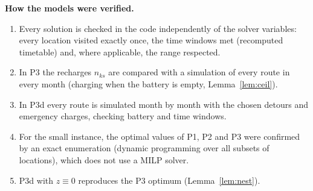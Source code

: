 \documentclass[11pt,a4paper]{article}
\theoremstyle{definition}
\begin{document}
\textbf{How the models were verified.}
\begin{enumerate}
\item Every solution is checked in the code independently of the solver variables: every location visited exactly once, the time windows met (recomputed timetable) and, where applicable, the range respected.
\item In P3 the recharges $n_{ks}$ are compared with a simulation of every route in every month (charging when the battery is empty, Lemma~\ref{lem:ceil}).
\item In P3d every route is simulated month by month with the chosen detours and emergency charges, checking battery and time windows.
\item For the small instance, the optimal values of P1, P2 and P3 were confirmed by an exact enumeration (dynamic programming over all subsets of locations), which does not use a MILP solver.
\item P3d with $z\equiv0$ reproduces the P3 optimum (Lemma~\ref{lem:nest}).
\end{enumerate}

\appendix
\end{document}
